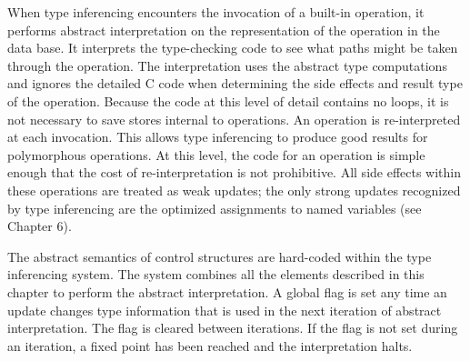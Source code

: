 When type inferencing encounters the invocation of a built-in
operation, it performs abstract interpretation on the representation
of the operation in the data base. It interprets the type-checking
code to see what paths might be taken through the operation. The
interpretation uses the abstract type computations and ignores the
detailed C code when determining the side effects and result type of
the operation. Because the code at this level of detail contains no
loops, it is not necessary to save stores internal to operations. An
operation is re-interpreted at each invocation.  This allows type
inferencing to produce good results for polymorphous operations. At
this level, the code for an operation is simple enough that the cost
of re-interpretation is not prohibitive. All side effects within these
operations are treated as weak updates; the only strong updates
recognized by type inferencing are the optimized assignments to named
variables (see Chapter 6).

The abstract semantics of control structures are hard-coded within the
type inferencing system. The system combines all the elements
described in this chapter to perform the abstract interpretation. A
global flag is set any time an update changes type information that is
used in the next iteration of abstract interpretation. The flag is
cleared between iterations. If the flag is not set during an
iteration, a fixed point has been reached and the interpretation
halts.

\bigskip
